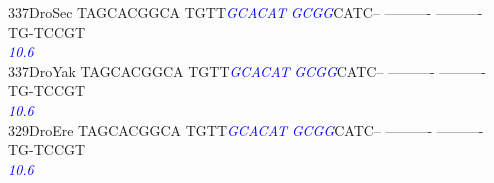 \documentclass[11pt,twoside,reqno,a4paper]{article}
\begin{document}
{337\hspace*{1\charwidth}DroSec	TAGCACGGCA	TGTT\textit{\textcolor{Blue}{G}}\textit{\textcolor{Blue}{C}}\textit{\textcolor{Blue}{A}}\textit{\textcolor{Blue}{C}}\textit{\textcolor{Blue}{A}}\textit{\textcolor{Blue}{T}}	\textit{\textcolor{Blue}{G}}\textit{\textcolor{Blue}{C}}\textit{\textcolor{Blue}{G}}\textit{\textcolor{Blue}{G}}CATC--	----------	----------	TG-TCCGT\\
\hspace*{4\charwidth}\hspace*{7\charwidth}\hspace*{1\charwidth}\hspace*{14\charwidth}\textit{\textcolor{Blue}{10.6}}\hspace*{1\charwidth}\hspace*{1\charwidth}\hspace*{1\charwidth}\hspace*{1\charwidth}\\
337\hspace*{1\charwidth}DroYak	TAGCACGGCA	TGTT\textit{\textcolor{Blue}{G}}\textit{\textcolor{Blue}{C}}\textit{\textcolor{Blue}{A}}\textit{\textcolor{Blue}{C}}\textit{\textcolor{Blue}{A}}\textit{\textcolor{Blue}{T}}	\textit{\textcolor{Blue}{G}}\textit{\textcolor{Blue}{C}}\textit{\textcolor{Blue}{G}}\textit{\textcolor{Blue}{G}}CATC--	----------	----------	TG-TCCGT\\
\hspace*{4\charwidth}\hspace*{7\charwidth}\hspace*{1\charwidth}\hspace*{14\charwidth}\textit{\textcolor{Blue}{10.6}}\hspace*{1\charwidth}\hspace*{1\charwidth}\hspace*{1\charwidth}\hspace*{1\charwidth}\\
329\hspace*{1\charwidth}DroEre	TAGCACGGCA	TGTT\textit{\textcolor{Blue}{G}}\textit{\textcolor{Blue}{C}}\textit{\textcolor{Blue}{A}}\textit{\textcolor{Blue}{C}}\textit{\textcolor{Blue}{A}}\textit{\textcolor{Blue}{T}}	\textit{\textcolor{Blue}{G}}\textit{\textcolor{Blue}{C}}\textit{\textcolor{Blue}{G}}\textit{\textcolor{Blue}{G}}CATC--	----------	----------	TG-TCCGT\\
\hspace*{4\charwidth}\hspace*{7\charwidth}\hspace*{1\charwidth}\hspace*{14\charwidth}\textit{\textcolor{Blue}{10.6}}\hspace*{1\charwidth}\hspace*{1\charwidth}\hspace*{1\charwidth}\hspace*{1\charwidth}\\
}
\end{document}
